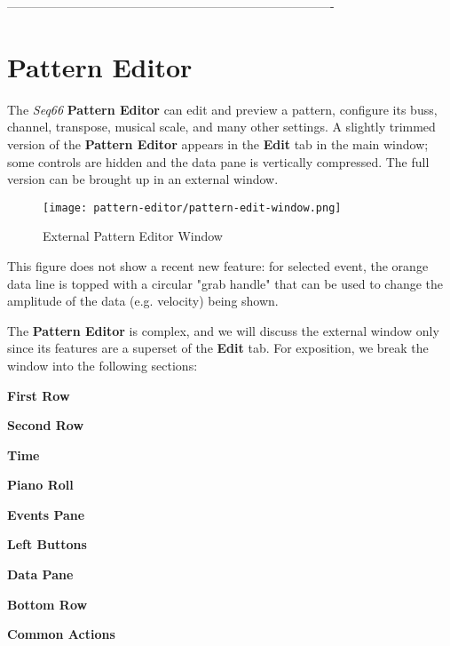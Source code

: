 -------------------------------------------------------------------------------
%
%

\section{Pattern Editor}
\label{sec:pattern_editor}

   The \textsl{Seq66} \textbf{Pattern Editor} can edit and preview a
   pattern, configure its buss, channel, transpose, musical
   scale, and many other settings.
   A slightly trimmed version of the \textbf{Pattern Editor} appears in the
   \textbf{Edit} tab in the main window; some controls are hidden and the data
   pane is vertically compressed.
   The full version can be brought up in an external window.

\begin{figure}[H]
   \centering 
   \texttt{[image: pattern-editor/pattern-edit-window.png]}
   \caption{External Pattern Editor Window}
   \label{fig:pattern_editor_window}
\end{figure}

   This figure does not show a recent new feature: for selected event,
   the orange data line is topped with a circular "grab handle" that can
   be used to change the amplitude of the data (e.g. velocity) being
   shown.
  
   The \textbf{Pattern Editor} is complex, and we will discuss the external
   window only since its features are a superset of the \textbf{Edit} tab.
   For exposition, we break the window into the following sections:

   \begin{enumber}
      \item \textbf{First Row}
      \item \textbf{Second Row}
      \item \textbf{Time}
      \item \textbf{Piano Roll}
      \item \textbf{Events Pane}
      \item \textbf{Left Buttons}
      \item \textbf{Data Pane}
      \item \textbf{Bottom Row}
      \item \textbf{Common Actions}
   \end{enumber}

